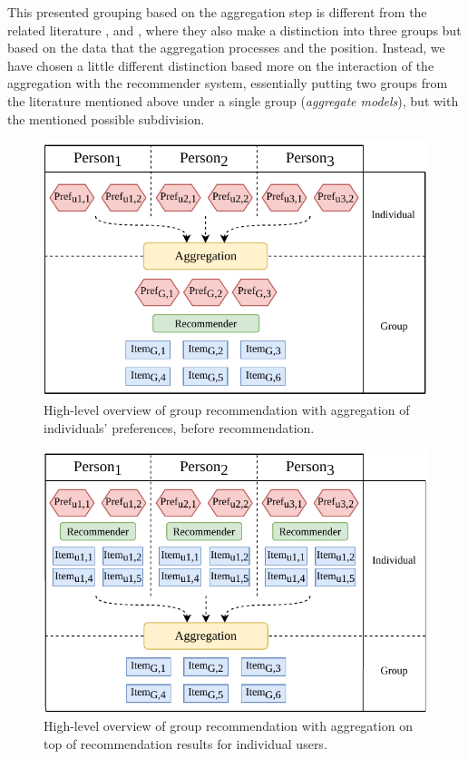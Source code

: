 This presented grouping based on the aggregation step is different from the related literature  \cite{recommendations_to_groups-jameson2007}, and \cite{grouprecommendersystems_felfernig2018group}, where they also make a distinction into three groups but based on the data that the aggregation processes and the position. Instead, we have chosen a little different distinction based more on the interaction of the aggregation with the recommender system, essentially putting two groups from the literature mentioned above under a single group (\textit{aggregate models}), but with the mentioned possible subdivision.
    

\begin{figure}[htbp]
    \centering
    \includegraphics{img/before-rec-aggregation.pdf}
    \caption{High-level overview of group recommendation with aggregation of individuals' preferences, before recommendation.}
    \label{fig:before_rec_agg}
\end{figure}

\begin{figure}[htbp]
    \centering
    \includegraphics{img/after-rec-aggregation.pdf}
    \caption{High-level overview of group recommendation with aggregation on top of recommendation results for individual users.}
    \label{fig:after_rec_agg}
\end{figure}






